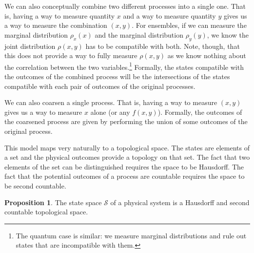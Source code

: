 \documentclass[aps,pra,10pt,twocolumn,floatfix,nofootinbib]{revtex4-1}
\numberwithin{equation}{section}
\theoremstyle{definition}
\newtheorem{prop}[equation]{Proposition}
\begin{document}
We can also conceptually combine two different processes into a single one. That is, having a way to measure quantity $x$ and a way to measure quantity $y$ gives us a way to measure the combination $(x,y)$. For ensembles, if we can measure the marginal distribution $\rho_x(x)$ and the marginal distribution $\rho_y(y)$, we know the joint distribution $\rho(x,y)$ has to be compatible with both. Note, though, that this does not provide a way to fully measure $\rho(x,y)$ as we know nothing about the correlation between the two variables.\footnote{The quantum case is similar: we measure marginal distributions and rule out states that are incompatible with them.} Formally, the states compatible with the outcomes of the combined process will be the intersections of the states compatible with each pair of outcomes of the original processes.

We can also coarsen a single process. That is, having a way to measure $(x,y)$ gives us a way to measure $x$ alone (or any $f(x,y)$). Formally, the outcomes of the coarsened process are given by performing the union of some outcomes of the original process.

This model maps very naturally to a topological space. The states are elements of a set and the physical outcomes provide a topology on that set. The fact that two elements of the set can be distinguished requires the space to be Hausdorff. The fact that the potential outcomes of a process are countable requires the space to be second countable.

\begin{prop}\label{statedef}
The state space $\mathcal{S}$ of a physical system is a Hausdorff and second countable topological space.
\end{prop}
\end{document}
